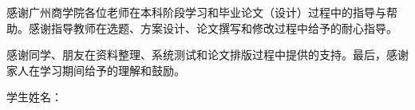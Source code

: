 
感谢广州商学院各位老师在本科阶段学习和毕业论文（设计）过程中的指导与帮助。感谢指导教师在选题、方案设计、论文撰写和修改过程中给予的耐心指导。

感谢同学、朋友在资料整理、系统测试和论文排版过程中提供的支持。最后，感谢家人在学习期间给予的理解和鼓励。

\vspace{1.5cm}
\begin{flushright}
学生姓名：\gccAuthor

\gccCoverDate
\end{flushright}

